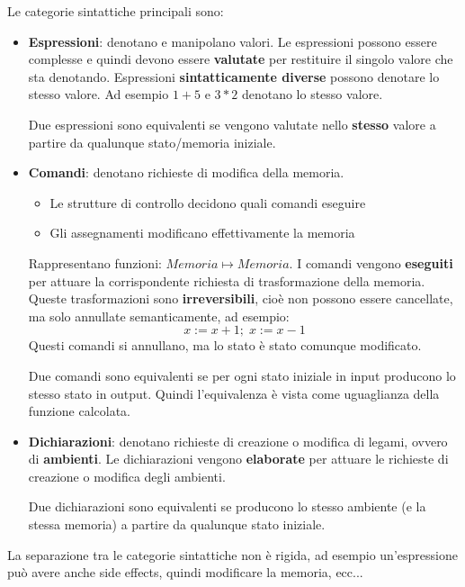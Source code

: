 \documentclass[a4paper]{article}
\begin{document}
\vspace{1em}
\noindent
Le categorie sintattiche principali sono:
\begin{itemize}
  \item \textbf{Espressioni}: denotano e manipolano valori. Le espressioni possono
    essere complesse e quindi devono essere \textbf{valutate} per restituire il
    singolo valore che sta denotando.
    Espressioni \textbf{sintatticamente diverse} possono denotare lo stesso valore.
    Ad esempio \( 1 + 5 \) e \( 3 * 2 \) denotano lo stesso valore.

    \begin{definition}
      Due espressioni sono equivalenti se vengono valutate nello \textbf{stesso}
      valore a partire da qualunque stato/memoria iniziale.
    \end{definition}


  \item \textbf{Comandi}: denotano richieste di modifica della memoria.
    \begin{itemize}
      \item Le strutture di controllo decidono quali comandi eseguire
      \item Gli assegnamenti modificano effettivamente la memoria
    \end{itemize}
    Rappresentano funzioni: \( Memoria \mapsto Memoria \). I comandi vengono
    \textbf{eseguiti} per attuare la corrispondente richiesta di trasformazione della
    memoria. Queste trasformazioni sono \textbf{irreversibili}, cioè non possono essere
    cancellate, ma solo annullate semanticamente, ad esempio:
    \[
      x := x + 1; \; x := x - 1
    \] 
    Questi comandi si annullano, ma lo stato è stato comunque modificato.

    \begin{definition}
      Due comandi sono equivalenti se per ogni stato iniziale in input producono lo
      stesso stato in output. Quindi l'equivalenza è vista come uguaglianza della
      funzione calcolata.
    \end{definition}

  \item \textbf{Dichiarazioni}: denotano richieste di creazione o modifica di legami,
    ovvero di \textbf{ambienti}. Le dichiarazioni vengono \textbf{elaborate} per
    attuare le richieste di creazione o modifica degli ambienti.

    \begin{definition}
      Due dichiarazioni sono equivalenti se producono lo stesso ambiente (e la stessa
      memoria) a partire da qualunque stato iniziale.
    \end{definition}
\end{itemize}
La separazione tra le categorie sintattiche non è rigida, ad esempio un'espressione
può avere anche side effects, quindi modificare la memoria, ecc...
\end{document}
